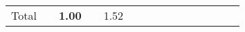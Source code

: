 \begin{tabular}{ll|rrrrrr|rrrrrrr}
  \hline
  Total  & &



  


  
  \textbf{1.00} &  & 1.52 &  &  &  &  &  &  &  &  \\


\end{tabular}
